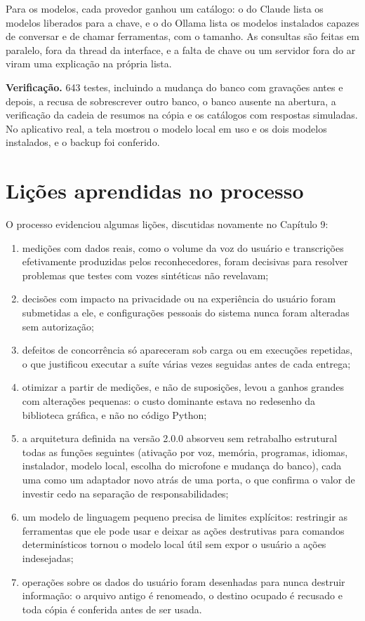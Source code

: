 Para os modelos, cada provedor ganhou um catálogo: o do Claude lista os modelos liberados para a chave,
e o do Ollama lista os modelos instalados capazes de conversar e de chamar ferramentas, com o tamanho.
As consultas são feitas em paralelo, fora da thread da interface, e a falta de chave ou um servidor
fora do ar viram uma explicação na própria lista.

\textbf{Verificação.} 643 testes, incluindo a mudança do banco com gravações antes e depois, a recusa
de sobrescrever outro banco, o banco ausente na abertura, a verificação da cadeia de resumos na cópia e
os catálogos com respostas simuladas. No aplicativo real, a tela mostrou o modelo local em uso e os
dois modelos instalados, e o backup foi conferido.

\section{Lições aprendidas no processo}

O processo evidenciou algumas lições, discutidas novamente no Capítulo 9:

\begin{enumerate}[label=\alph*)]
  \item medições com dados reais, como o volume da voz do usuário e transcrições efetivamente produzidas
        pelos reconhecedores, foram decisivas para resolver problemas que testes com vozes sintéticas
        não revelavam;
  \item decisões com impacto na privacidade ou na experiência do usuário foram submetidas a ele, e
        configurações pessoais do sistema nunca foram alteradas sem autorização;
  \item defeitos de concorrência só apareceram sob carga ou em execuções repetidas, o que justificou
        executar a suíte várias vezes seguidas antes de cada entrega;
  \item otimizar a partir de medições, e não de suposições, levou a ganhos grandes com alterações
        pequenas: o custo dominante estava no redesenho da biblioteca gráfica, e não no código Python;
  \item a arquitetura definida na versão 2.0.0 absorveu sem retrabalho estrutural todas as funções
        seguintes (ativação por voz, memória, programas, idiomas, instalador, modelo local, escolha do
        microfone e mudança do banco), cada uma como um adaptador novo atrás de uma porta, o que confirma
        o valor de investir cedo na separação de responsabilidades;
  \item um modelo de linguagem pequeno precisa de limites explícitos: restringir as ferramentas que ele
        pode usar e deixar as ações destrutivas para comandos determinísticos tornou o modelo local útil
        sem expor o usuário a ações indesejadas;
  \item operações sobre os dados do usuário foram desenhadas para nunca destruir informação: o arquivo
        antigo é renomeado, o destino ocupado é recusado e toda cópia é conferida antes de ser usada.
\end{enumerate}
